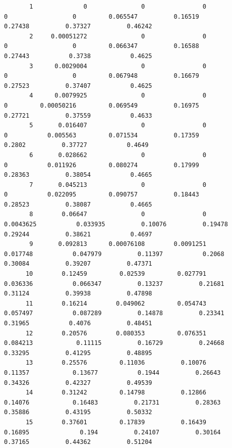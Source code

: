 \documentclass[
]{book}
\begin{document}
\begin{verbatim}
       1              0               0                0                 0                  0         0.065547          0.16519          0.27438          0.37327          0.46242   
       2     0.00051272               0                0                 0                  0         0.066347          0.16588          0.27443           0.3738           0.4625   
       3      0.0029004               0                0                 0                  0         0.067948          0.16679          0.27523          0.37407           0.4625   
       4      0.0079925               0                0                 0         0.00050216         0.069549          0.16975          0.27721          0.37559           0.4633   
       5       0.016407               0                0                 0           0.005563         0.071534          0.17359           0.2802          0.37727           0.4649   
       6       0.028662               0                0                 0           0.011926         0.080274          0.17999          0.28363          0.38054           0.4665   
       7       0.045213               0                0                 0           0.022095         0.090757          0.18443          0.28523          0.38087           0.4665   
       8        0.06647               0                0         0.0043625           0.033935          0.10076          0.19478          0.29244          0.38621           0.4697   
       9       0.092813      0.00076108        0.0091251          0.017748           0.047979          0.11397           0.2068          0.30084          0.39207          0.47371   
      10        0.12459         0.02539         0.027791          0.036336           0.066347          0.13237          0.21681          0.31124          0.39938          0.47898   
      11        0.16214        0.049062         0.054743          0.057497           0.087289          0.14878          0.23341          0.31965           0.4076          0.48451   
      12        0.20576        0.080353         0.076351          0.084213            0.11115          0.16729          0.24668          0.33295          0.41295          0.48895   
      13        0.25576         0.11036          0.10076           0.11357            0.13677           0.1944          0.26643          0.34326          0.42327          0.49539   
      14        0.31242         0.14798          0.12866           0.14076            0.16483          0.21731          0.28363          0.35886          0.43195          0.50332   
      15        0.37601         0.17839          0.16439           0.16895              0.194          0.24107          0.30164          0.37165          0.44362          0.51204   

\end{verbatim}
\end{document}
